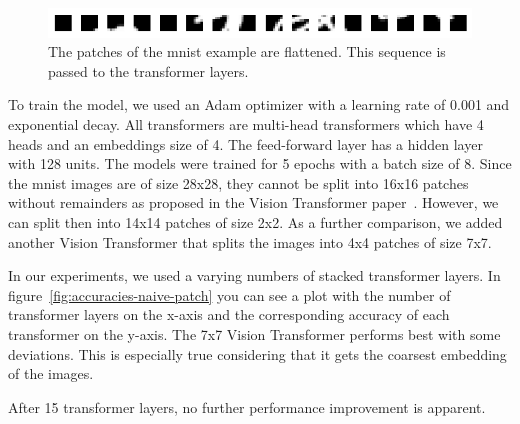 \documentclass[a4paper]{scrartcl}
\begin{document}
    \begin{figure}[btp]
        \centering
        \includegraphics[width=0.8\linewidth]{img/plots/patches/example_tiles_linear}
        \caption[Flattened patches of an mnist example]{The patches of the mnist example are flattened. This sequence is passed to the transformer layers.}
        \label{fig:flattened-mnist-patches}
    \end{figure}

    To train the model, we used an Adam optimizer with a learning rate of 0.001 and exponential decay.
    All transformers are multi-head transformers which have 4 heads and an embeddings size of 4.
    The feed-forward layer has a hidden layer with 128 units.
    The models were trained for 5 epochs with a batch size of 8.
    Since the mnist images are of size 28x28, they cannot be split into 16x16 patches without remainders as proposed in the Vision Transformer paper~\cite{dosovitskiy2021image}.
    However, we can split then into 14x14 patches of size 2x2.
    As a further comparison, we added another Vision Transformer that splits the images into 4x4 patches of size 7x7.

    In our experiments, we used a varying numbers of stacked transformer layers.
    In figure~\ref{fig:accuracies-naive-patch} you can see a plot with the number of transformer layers on the x-axis and the corresponding accuracy of each transformer on the y-axis.
    The 7x7 Vision Transformer performs best with some deviations.
    This is especially true considering that it gets the coarsest embedding of the images.

    After 15 transformer layers, no further performance improvement is apparent.
\end{document}
